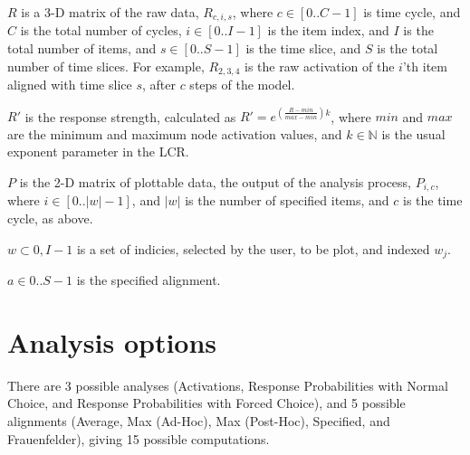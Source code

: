 \documentclass{article}
\begin{document}
$R$ is a 3-D matrix of the raw data, $R_{c,i,s}$, where $c \in [0..C-1]$ is
time cycle, and $C$ is the total number of cycles, $i \in [0..I-1]$ is
the item index, and $I$ is the total number of items, and $s \in [0..S-1]$ is
the time slice, and $S$ is the total number of time slices. For example,
$R_{2,3,4}$ is the raw activation of the $i$'th item aligned with time slice
$s$, after $c$ steps of the model.

$R'$ is the response strength, calculated as $R' = e^{(\frac{R-min}{max-min})
k}$, where $min$ and $max$ are the minimum and maximum node activation values,
and $k \in \mathbb{N}$ is the usual exponent parameter in the LCR.

$P$ is the 2-D matrix of plottable data, the output of the analysis process,
$P_{i,c}$, where $i \in [0..\vert w \vert-1]$, and $\vert w \vert$ is the
number of specified items, and $c$ is the time cycle, as above.

$w \subset {0,I-1}$ is a set of indicies, selected by the user, to be plot,
and indexed $w_j$.

$a \in {0..S-1}$ is the specified alignment.

\section{Analysis options}

There are 3 possible analyses (Activations, Response Probabilities
with Normal Choice, and Response Probabilities with Forced Choice), and
5 possible alignments (Average, Max (Ad-Hoc), Max (Post-Hoc), Specified, and
Frauenfelder), giving 15 possible computations.

\vspace{.3in}
\end{document}
